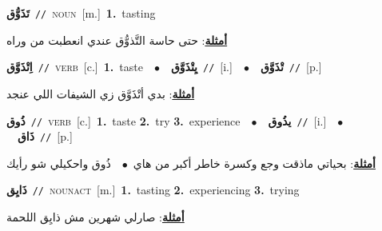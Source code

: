 \documentclass[10pt,a4paper,twoside]{article} %
\begin{document}
\begin{multicols}{2}
{{{{{{{{{\setlength\topsep{0pt}\textbf{\foreignlanguage{arabic}{تَذَوُّق}}\ {\color{gray}\texttt{//}\color{black}}\ \textsc{noun}\ [m.]\ \textbf{1.}~tasting\  \begin{flushright}\color{gray}\foreignlanguage{arabic}{\textbf{\underline{\foreignlanguage{arabic}{أمثلة}}}: حتى حاسة التَّذوُّق عندي انعطبت من وراه}\end{flushright}\color{black}} \vspace{2mm}

{\setlength\topsep{0pt}\textbf{\foreignlanguage{arabic}{اِتْذَوَّق}}\ {\color{gray}\texttt{//}\color{black}}\ \textsc{verb}\ [c.]\ \textbf{1.}~taste\ \ $\bullet$\ \ \setlength\topsep{0pt}\textbf{\foreignlanguage{arabic}{يِتْذَوَّق}}\ {\color{gray}\texttt{//}\color{black}}\ [i.]\ \ $\bullet$\ \ \setlength\topsep{0pt}\textbf{\foreignlanguage{arabic}{تْذَوَّق}}\ {\color{gray}\texttt{//}\color{black}}\ [p.]\  \begin{flushright}\color{gray}\foreignlanguage{arabic}{\textbf{\underline{\foreignlanguage{arabic}{أمثلة}}}: بدي أتْذَوَّق زي الشيفات اللي عنجد}\end{flushright}\color{black}} \vspace{2mm}

{\setlength\topsep{0pt}\textbf{\foreignlanguage{arabic}{ذُوق}}\ {\color{gray}\texttt{//}\color{black}}\ \textsc{verb}\ [c.]\ \textbf{1.}~taste  \textbf{2.}~try  \textbf{3.}~experience\ \ $\bullet$\ \ \setlength\topsep{0pt}\textbf{\foreignlanguage{arabic}{يذُوق}}\ {\color{gray}\texttt{//}\color{black}}\ [i.]\ \ $\bullet$\ \ \setlength\topsep{0pt}\textbf{\foreignlanguage{arabic}{ذَاق}}\ {\color{gray}\texttt{//}\color{black}}\ [p.]\  \begin{flushright}\color{gray}\foreignlanguage{arabic}{\textbf{\underline{\foreignlanguage{arabic}{أمثلة}}}: بحياتي ماذقت وجع وكسرة خاطر أكبر من هاي\ $\bullet$\ \  ذُوق واحكيلي شو رأيك}\end{flushright}\color{black}} \vspace{2mm}

{\setlength\topsep{0pt}\textbf{\foreignlanguage{arabic}{ذَايِق}}\ {\color{gray}\texttt{//}\color{black}}\ \textsc{noun\textunderscore act}\ [m.]\ \textbf{1.}~tasting  \textbf{2.}~experiencing  \textbf{3.}~trying\  \begin{flushright}\color{gray}\foreignlanguage{arabic}{\textbf{\underline{\foreignlanguage{arabic}{أمثلة}}}: صارلي شهرين مش ذايِق اللحمة}\end{flushright}\color{black}} \vspace{2mm}

}}}}}}}}
\end{multicols}
\end{document}
